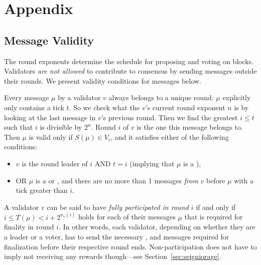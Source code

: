 \appendix

\section{Appendix}

\subsection{Message Validity}
\label{sec:message-validity}

The round exponents determine the schedule for proposing and voting on blocks. Validators \emph{are not allowed} to contribute to consensus by sending messages outside their rounds. We present validity conditions for messages below.

Every message $\mu$ by a validator $v$ always belongs to a unique round: $\mu$ explicitly only contains a tick $t$. So we check what the $v$'s current round exponent $n$ is by looking at the last message in $v$'s previous round. Then we find the greatest $i\leq t$ such that $i$ is divisible by $2^n$. Round $i$ of $v$ is the one this message belongs to. Then $\mu$ is valid only if $S(\mu)\in V_i$, and it satisfies either of the following conditions:

\begin{itemize}
\item
  $v$ is the round leader of $i$ AND $t = i$ (implying that $\mu$ is a \PROP),
\item
  OR $\mu$ is a \CONF or \WIT, and there are no more than 1 messages
  \emph{from} $v$ before $\mu$ with a tick greater than $i$.
\end{itemize}

A validator $v$ can be said to have \emph{fully participated in round $i$} if and only if $i \leq T(\mu) <i+2^{n_v(i)}$ holds for each of their messages $\mu$ that is required for finality in round $i$. In other words, each validator, depending on whether they are a leader or a voter, has to send the necessary \PROP, \CONF and \WIT messages required for finalization before their respective round ends. Non-participation does not have to imply not receiving any rewards though---see Section~\ref{sec:seigniorage}.
